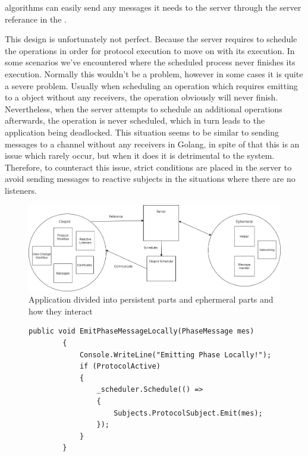 algorithms can easily send any messages it needs to the server through the server referance in the . 

This design is unfortunately not perfect. Because the server requires to schedule the operations in order for protocol execution to move on with its execution. In some scenarios we've encountered where the scheduled process never finishes its execution. Normally this wouldn't be a problem, however in some cases it is quite a severe problem. Usually when scheduling an operation which requires emitting to a  object without any receivers, the operation obviously will never finish. Nevertheless, when the server attempts to schedule an additional operations afterwards, the operation is never scheduled, which in turn leads to the application being deadlocked. This situation seems to be similar to sending messages to a channel without any receivers in Golang\cite{WEB:golangChannels}, in spite of that this is an issue which rarely occur, but when it does it is detrimental to the system. Therefore, to counteract this issue, strict conditions are placed in the server to avoid sending messages to reactive subjects in the situations where there are no listeners. %

\begin{figure}[H]
	\includegraphics[width=\linewidth]{figures/CleipnirStructure}
	\caption{Application divided into persistent parts and ephermeral parts and how they interact}
	\label{fig:PersistencyEphemeral}
\end{figure}

\begin{figure}[h]
	\centering
	\begin{lstlisting}[label = code:schedulerEmit, caption= Example of server and protocol interaction using Cleipnir scheduler, captionpos=b, basicstyle=\scriptsize]
	public void EmitPhaseMessageLocally(PhaseMessage mes)
        {
            Console.WriteLine("Emitting Phase Locally!");
            if (ProtocolActive)
            {
                _scheduler.Schedule(() =>
                {
                    Subjects.ProtocolSubject.Emit(mes);
                });    
            }
        }
	\end{lstlisting}
\end{figure}